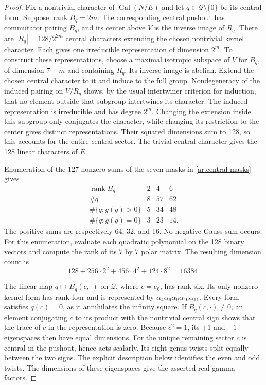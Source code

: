 \begin{proof}
Fix a nontrivial character of $\operatorname{Gal}(N/E)$ and let
$q\in\mathcal Q\setminus\{0\}$ be its central form. Suppose
$\operatorname{rank}B_q=2m$. The corresponding central pushout has
commutator pairing $B_q$, and its center above $V$ is the inverse image
of $R_q$. There are $|R_q|=128/2^{2m}$ central characters extending the
chosen nontrivial kernel character. Each gives one irreducible
representation of dimension $2^m$.
To construct these representations, choose a maximal isotropic subspace
of $V$ for $B_q$, of dimension $7-m$ and containing $R_q$. Its inverse image is abelian.
Extend the chosen central character to it and induce to the full group.
Nondegeneracy of the induced pairing on $V/R_q$ shows, by the usual
intertwiner criterion for induction, that no element outside that
subgroup intertwines its character. The induced representation is
irreducible and has degree $2^m$. Changing the extension inside this
subgroup only conjugates the character, while changing its restriction
to the center gives distinct representations. Their squared dimensions
sum to 128, so this accounts for the entire central sector.
The trivial central character gives the 128 linear characters of $E$.

Enumeration of the 127 nonzero sums of the seven masks in
\eqref{ar:central-masks} gives
\[
\begin{array}{c|rrr}
 \operatorname{rank}B_q&2&4&6\\\hline
 \#q&8&57&62\\
 \#\{q:g(q)>0\}&5&34&48\\
 \#\{q:g(q)=0\}&3&23&14.
\end{array}
\]
The positive sums are respectively 64, 32, and 16. No negative Gauss
sum occurs. For this enumeration, evaluate each quadratic polynomial on the 128
binary vectors and compute the rank of its $7$ by $7$ polar matrix.
The resulting dimension count is
\[
 128+256\cdot2^2+456\cdot4^2+124\cdot8^2=16384.
\]

The linear map $q\mapsto B_q(c,\cdot)$ on $\mathcal Q$, where
$c=e_0$, has rank six. Its only nonzero kernel form has rank four
and is represented by $\alpha_4\alpha_6\alpha_9\alpha_{10}\alpha_{11}$.
Every form satisfies $q(c)=0$, as it annihilates the infinity square.
If $B_q(c,\cdot)\ne0$, an element conjugating $c$ to its product with
the nontrivial central sign shows that the trace of $c$ in the
representation is zero. Because $c^2=1$, its $+1$ and $-1$ eigenspaces
then have equal dimensions. For the unique remaining sector $c$ is
central in the pushout, hence acts scalarly. Its eight genus twists
split equally between the two signs. The explicit description below
identifies the even and odd twists. The dimensions of these eigenspaces
give the asserted real gamma factors.
\end{proof}

